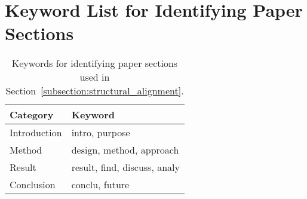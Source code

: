 \documentclass[11pt,a4paper]{article}
\begin{document}



\clearpage
\appendix
\section{Keyword List for Identifying Paper Sections}
\label{sec:cue_word}
\begin{table}[!ht]
    \centering
    \fontsize{10}{10}\selectfont 
    \begin{tabular}{ll}
        \toprule\midrule
        \textbf{Category} & \textbf{Keyword} \\ \midrule
        Introduction & intro, purpose \\
        Method & design, method, approach \\
        Result & result, find, discuss, analy \\
        Conclusion & conclu, future \\
        \bottomrule
    \end{tabular}
    \caption{Keywords for identifying paper sections used in Section~\ref{subsection:structural_alignment}.}
    \label{table:cue_word}
\end{table}
\end{document}

